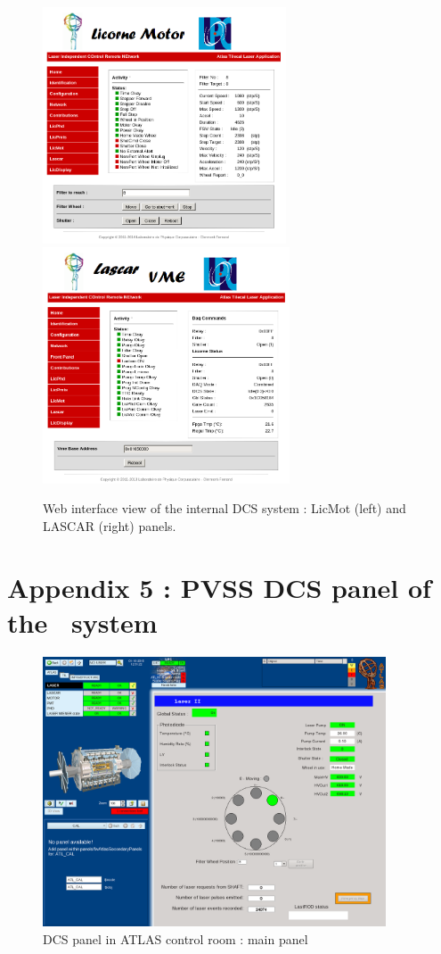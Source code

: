 \begin{figure}[htbp]
\centering
\includegraphics[height=7cm]{figures/licorne_web3.png}
\includegraphics[height=7cm]{figures/licorne_web4.png}
\caption{Web interface view of the internal DCS system : LicMot (left) and LASCAR (right) panels.}\label{fig:licorne_webb}
\end{figure}


\newpage

\part*{Appendix 5 : PVSS DCS panel of the \lasii~system}
\label{app:e}
\begin{figure}[htbp]
\centering
\includegraphics[height=8cm]{figures/dcs_cr_filterwheel.png}
\caption{DCS panel in ATLAS control room : main panel}\label{fig:dcs_cr_a}
\end{figure}

